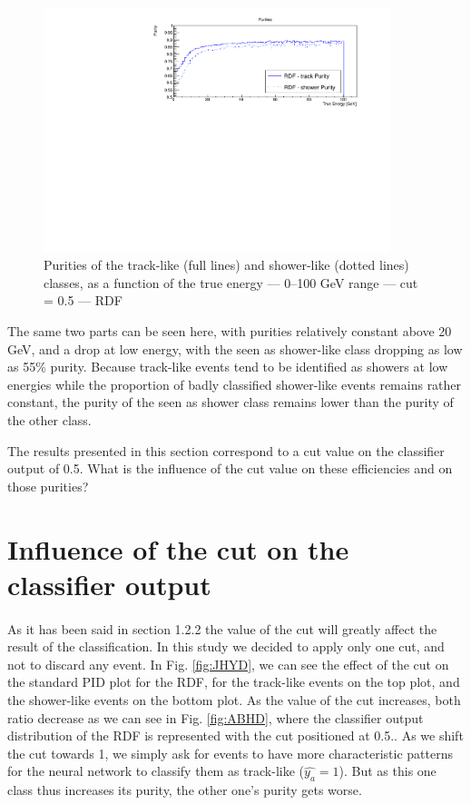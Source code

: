\begin{figure}[h!]
    \centering
    \includegraphics[width=0.9\textwidth]{fig/PID_Purity_RDF_CUT_0_5_E_cut_100.pdf}
    \caption{Purities of the track-like (full lines) and shower-like (dotted lines) classes, as a function of the true energy  --- 0--100 GeV range --- cut = 0.5 --- RDF}
    \label{fig:KJINDE}
\end{figure}

The same two parts can be seen here, with purities relatively constant above 20 GeV, and a drop at low energy, with the seen as shower-like class dropping as low as 55\% purity. Because track-like events tend to be identified as showers at low energies while the proportion of badly classified shower-like events remains rather constant, the purity of the seen as shower class remains lower than the purity of the other class.

The results presented in this section correspond to a cut value on the classifier output of 0.5. What is the influence of the cut value on these efficiencies and on those purities?

\section{Influence of the cut on the classifier output}

\paragraph{} As it has been said in section 1.2.2 the value of the cut will greatly affect the result of the classification. In this study we decided to apply only one cut, and not to discard any event. In Fig. \ref{fig:JHYD}, we can see the effect of the cut on the standard PID plot for the RDF, for the track-like events on the top plot, and the shower-like events on the bottom plot. As the value of the cut increases, both ratio decrease as we can see in Fig. \ref{fig:ABHD}, where the classifier output distribution of the RDF is represented with the cut positioned at 0.5.. As we shift the cut towards 1, we simply ask for events to have more characteristic patterns for the neural network to classify them as track-like ($\hat{y_a}=1$). But as this one class thus increases its purity, the other one's purity gets worse.

